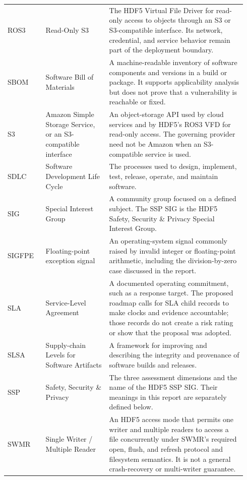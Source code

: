 \documentclass[../main.tex]{subfiles}
\begin{document}
\begin{longtable}{@{}>{\raggedright\arraybackslash}p{0.15\linewidth}>{\raggedright\arraybackslash}p{0.25\linewidth}p{0.54\linewidth}@{}}
ROS3 & Read-Only S3 &
The HDF5 Virtual File Driver for read-only access to objects through an S3 or
S3-compatible interface. Its network, credential, and service behavior remain
part of the deployment boundary. \\

SBOM & Software Bill of Materials &
A machine-readable inventory of software components and versions in a build or
package. It supports applicability analysis but does not prove that a
vulnerability is reachable or fixed. \\

S3 & Amazon Simple Storage Service, or an S3-compatible interface &
An object-storage API used by cloud services and by HDF5's ROS3 VFD for
read-only access. The governing provider need not be Amazon when an
S3-compatible service is used. \\

SDLC & Software Development Life Cycle &
The processes used to design, implement, test, release, operate, and maintain
software. \\

SIG & Special Interest Group &
A community group focused on a defined subject. The SSP SIG is the HDF5 Safety,
Security \& Privacy Special Interest Group. \\

SIGFPE & Floating-point exception signal &
An operating-system signal commonly raised by invalid integer or floating-point
arithmetic, including the division-by-zero case discussed in the report. \\

SLA & Service-Level Agreement &
A documented operating commitment, such as a response target. The proposed
roadmap calls for SLA child records to make clocks and evidence accountable;
those records do not create a risk rating or show that the proposal was
adopted. \\

SLSA & Supply-chain Levels for Software Artifacts &
A framework for improving and describing the integrity and provenance of
software builds and releases. \\

SSP & Safety, Security \& Privacy &
The three assessment dimensions and the name of the HDF5 SSP SIG. Their
meanings in this report are separately defined below. \\

SWMR & Single Writer / Multiple Reader &
An HDF5 access mode that permits one writer and multiple readers to access a
file concurrently under SWMR's required open, flush, and refresh protocol and
filesystem semantics. It is not a general crash-recovery or multi-writer
guarantee. \\


\end{longtable}
\end{document}
